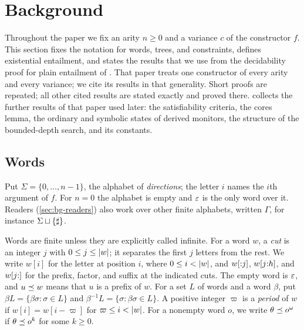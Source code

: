 
\section{Background}\label{sec:bg}

Throughout the paper we fix an arity $n\ge0$ and a variance $c$ of the
constructor $f$. This section fixes the notation for words, trees, and
constraints, defines existential entailment, and states the results that we
use from the decidability proof for plain entailment of \citet{Zhao26}. That
paper treats one constructor of every arity and every variance; we cite its
results in that generality. Short proofs are repeated; all other cited results
are stated exactly and proved there.  collects the further
results of that paper used later: the satisfiability criteria, the cores lemma, the ordinary
and symbolic states of derived monitors, the structure of the bounded-depth
search, and its constants.

\subsection{Words}\label{sec:bg-words}
Put $\Sigma=\{0,\ldots,n-1\}$, the alphabet of \emph{directions}; the letter
$i$ names the $i$th argument of $f$. For $n=0$ the alphabet is empty and $\varepsilon$
is the only word over it. Readers (\cref{sec:bg-readers}) also work over other
finite alphabets, written $\Gamma$, for instance $\Sigma\sqcup\{\sharp\}$.

Words are finite unless they are explicitly called infinite. For a word $w$, a
\emph{cut} is an integer $j$ with $0\le j\le\lvert w\rvert$; it separates the first $j$
letters from the rest. We write $w[i]$ for the letter at position $i$, where
$0\le i<\lvert w\rvert$, and $w[{:}j]$, $w[j{:}h]$, and $w[j{:}]$ for the prefix,
factor, and suffix at the indicated cuts. The empty word is $\varepsilon$, and
$u\preceq w$ means that $u$ is a prefix of $w$. For a set $L$ of words and a word
$\beta$, put $\beta L=\{\beta\sigma:\sigma\in L\}$ and
$\beta^{-1}L=\{\sigma:\beta\sigma\in L\}$. A positive integer $\varpi$ is a
\emph{period} of $w$ if $w[i]=w[i-\varpi]$ for $\varpi\le i<\lvert w\rvert$. For a
nonempty word $o$, we write $\theta\preceq o^\omega$ if $\theta\preceq o^k$ for some
$k\ge0$.

